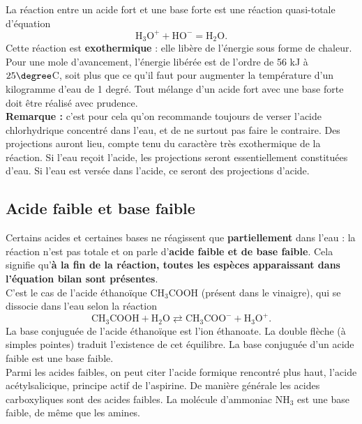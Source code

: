 \documentclass[11pt,a4paper]{report}
\begin{document}
La réaction entre un acide fort et une base forte est une réaction quasi-totale d'équation
\begin{equation}
	 \text{H}_3\text{O}^+ + \text{HO}^- = \text{H}_2\text{O}.
\end{equation}
Cette réaction est \textbf{exothermique} : elle libère de l'énergie sous forme de chaleur. Pour une mole d'avancement, l'énergie libérée est de l'ordre de 56 kJ à $25\degree$C, soit plus que ce qu'il faut pour augmenter la température d'un kilogramme d'eau de 1 degré. Tout mélange d'un acide fort avec une base forte doit être réalisé avec prudence.\\

\textbf{Remarque :} c'est pour cela qu'on recommande toujours de verser l'acide chlorhydrique concentré dans l'eau, et de ne surtout pas faire le contraire. Des projections auront lieu, compte tenu du caractère très exothermique de la réaction. Si l'eau reçoit l'acide, les projections seront essentiellement constituées d'eau. Si l'eau est versée dans l'acide, ce seront des projections d'acide.\\

\subsection{Acide faible et base faible}

Certains acides et certaines bases ne réagissent que \textbf{partiellement} dans l'eau : la réaction n'est pas totale et on parle d'\textbf{acide faible et de base faible}. Cela signifie qu'\textbf{à la fin de la réaction, toutes les espèces apparaissant dans l'équation bilan sont présentes}.\\

C'est le cas de l'acide éthanoïque $\text{CH}_3\text{COOH}$ (présent dans le vinaigre), qui se dissocie dans l'eau selon la réaction
\begin{equation}
	\text{CH}_3\text{COOH} + \text{H}_2\text{O} \rightleftarrows
	\text{CH}_3\text{COO}^- + \text{H}_3\text{O}^+.
\end{equation} 
La base conjuguée de l'acide éthanoïque est l'ion éthanoate. La double flèche (à simples pointes) traduit l'existence de cet équilibre. La base conjuguée d'un acide faible est une base faible.\\

Parmi les acides faibles, on peut citer l'acide formique rencontré plus haut, l'acide acétylsalicique, principe actif de l'aspirine. De manière générale les acides carboxyliques sont des acides faibles. La molécule d'ammoniac $\text{NH}_3$ est une base faible, de même que les amines.\\
\end{document}
